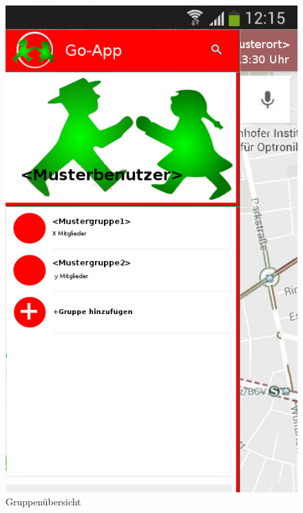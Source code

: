 \begin{figure}
	\caption{Gruppenübersicht}
	\includegraphics[scale = 0.5]{resources/images/gruppenuebersicht.png}
\end{figure}

